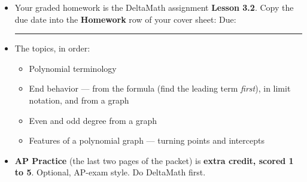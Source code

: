 \documentclass[aspectratio=169, 11pt]{beamer}
\begin{document}
\begin{frame}[t, plain]

  \begin{itemize}\setlength{\itemsep}{8pt}
    \item Your graded homework is the DeltaMath assignment \textbf{Lesson 3.2}.
          Copy the due date into the \textbf{Homework} row of your cover sheet:
          \quad Due: \rule{3cm}{0.4pt}
    \item The topics, in order:
          \begin{itemize}\setlength{\itemsep}{2pt}
            \item Polynomial terminology
            \item End behavior --- from the formula (find the leading term \textit{first}),
                  in limit notation, and from a graph
            \item Even and odd degree from a graph
            \item Features of a polynomial graph --- turning points and intercepts
          \end{itemize}
    \item \textbf{AP Practice} (the last two pages of the packet) is
          \textbf{extra credit, scored 1 to 5}. Optional, AP-exam style. Do DeltaMath first.
  \end{itemize}
\end{frame}
\end{document}
